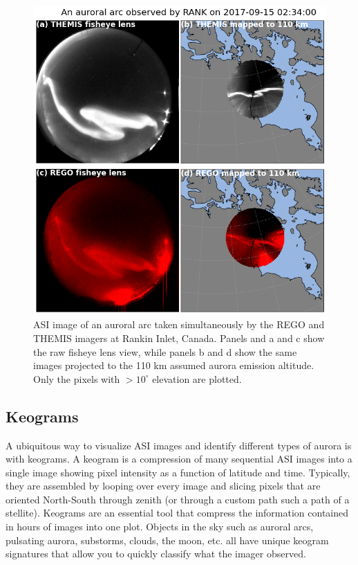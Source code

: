 \documentclass[draft]{agujournal2019}
\begin{document}
\begin{figure}
      \includegraphics[width=\textwidth]{figures/fig2.png}
      \caption{ASI image of an auroral arc taken simultaneously by the REGO and THEMIS imagers at Rankin Inlet, Canada. Panels and a and c show the raw fisheye lens view, while panels b and d show the same images projected to the 110 km assumed aurora emission altitude. Only the pixels with $>10^\circ$ elevation are plotted.}
      \label{fig2}
\end{figure}

\subsection{Keograms}
A ubiquitous way to visualize ASI images and identify different types of aurora is with keograms. A keogram is a compression of many sequential ASI images into a single image showing pixel intensity as a function of latitude and time. Typically, they are assembled by looping over every image and slicing pixels that are oriented North-South through zenith (or through a custom path such a path of a stellite). Keograms are an essential tool that compress the information contained in hours of images into one plot. Objects in the sky such as auroral arcs, pulsating aurora, substorms, clouds, the moon, etc. all have unique keogram signatures that allow you to quickly classify what the imager observed. 
\end{document}
